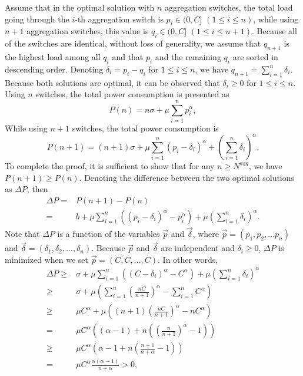 \documentclass[journal,single-space,two column,twoside,10pt]{IEEEtran}
\begin{document}
Assume that in the optimal solution with $n$ aggregation switches, the total load going through the $i$-th aggregation switch is $p_i \in (0, C]$ $(1 \leq i \leq n)$, while using $n+1$ aggregation switches, this value is $q_i \in (0,C]$ $(1 \leq i \leq n +1)$. Because all of the switches are identical, without loss of generality, we assume that $q_{n+1}$ is the highest load among all $q_i$ and that $p_i$ and the remaining $q_i$ are sorted in descending order. Denoting $\delta_i = p_i - q_i$ for $1 \leq i \leq n$, we have $q_{n+1} = \sum_{i=1}^n \delta_i$. Because both solutions are optimal, it can be observed that $\delta_i \geq 0$ for $1\leq i \leq n$. Using $n$ switches, the total power consumption is presented as
\begin{equation}
P(n) = n \sigma + \mu \sum_{i=1}^n p_i^{\alpha},
\end{equation}
While using $n+1$ switches, the total power consumption is
\begin{equation}
P(n+1) = (n+1) \sigma + \mu \sum_{i=1}^n (p_i - \delta_i)^{\alpha} + \left( \sum_{i=1}^n \delta_i \right)^{\alpha}.
\end{equation}
To complete the proof, it is sufficient to show that for any $n \geq N^{agg}$, we have $P(n+1) \geq P(n)$. Denoting the difference between the two optimal solutions as $\Delta P$, then
\begin{equation}
\begin{aligned}
	\Delta P	= & P(n+1) - P(n) \\
			= & b + \mu \sum_{i=1}^n ((p_i-\delta_i)^{\alpha} - p_i^{\alpha}) + \mu \left(\sum_{i=1}^n \delta_i\right)^{\alpha}.
\end{aligned}
\end{equation}
Note that $\Delta P$ is a function of the variables $\vec{p}$ and $\vec{\delta}$, where $\vec{p} = (p_1, p_2, ...p_n)$ and $\vec{\delta} = (\delta_1,\delta_2,...,\delta_n)$. Because $\vec{p}$ and $\vec{\delta}$ are independent and $\delta_i \geq 0$, $\Delta P$ is minimized when we set $\vec{p} = (C,C,...,C)$. In other words,
\begin{equation}
\begin{aligned}
\Delta P	\geq & \sigma + \mu \sum_{i=1}^n ((C-\delta_i)^{\alpha} - C^{\alpha}) + \mu \left( \sum_{i=1}^n \delta_i \right)^{\alpha} \\
		\geq& \sigma + \mu \left( \sum_{i=1}^n \left( \frac{nC}{n+1} \right)^{\alpha} - \sum_{i=1}^n C^{\alpha} \right) \\
		\geq& \mu C^{\alpha} + \mu \left( (n+1)\left( \frac{nC}{n+1} \right)^{\alpha} - nC^{\alpha} \right) \\
		=& \mu C^{\alpha} \left( (\alpha - 1) + n \left( \left( \frac{n}{n+1} \right)^{\alpha} - 1   \right)  \right) \\
		\geq &\mu C^{\alpha} \left( \alpha - 1 + n\left( \frac{n+1}{n+\alpha} - 1 \right) \right) \\
		=& \mu C^{\alpha} \frac{\alpha(\alpha - 1)}{n + \alpha} > 0,
\end{aligned}
\end{equation}
\end{document}
